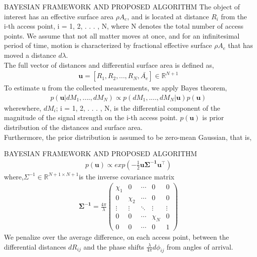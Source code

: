 \documentclass{beamer}
\providecommand{\brak}[1]{\ensuremath{\left(#1\right)}}
\begin{document}
\begin{frame}{BAYESIAN FRAMEWORK AND PROPOSED ALGORITHM}
    The object of interest has an effective surface area $\rho A_e$,
and is located at distance $R_i$ from the i-th access point,
i = 1, 2, . . . , N, where N denotes the total number of access
points. We assume that not all matter moves at once, and for
an infinitesimal period of time, motion is characterized by fractional effective surface $\rho A_e$ that has moved a distance $d\lambda$.\\
The full vector of distances and differential surface area is
defined as,
\begin{align}
    \boldsymbol{u}=[R_1,R_2,...,R_N,\bar{A_e}] \in \mathbb{R}^{N+1}
\end{align}
To estimate u from the collected measurements, we apply Bayes theorem,
\begin{align}
      \mathit{p}(\boldsymbol{u}|dM_1,....,dM_N) \propto \mathit{p}(dM_1,....,dM_N|\boldsymbol{u})\mathit{p}(\boldsymbol{u})
  \end{align} 
wherewhere, $dM_i$; i = 1, 2, . . . , N, is the differential component
of the magnitude of the signal strength on the i-th access
point. $\mathit{p}(\boldsymbol{u})$ is prior distribution of the
distances and surface area.\\
Furthermore, the prior distribution
is assumed to be zero-mean Gaussian, that is,
\end{frame}
\begin{frame}{BAYESIAN FRAMEWORK AND PROPOSED ALGORITHM}
\begin{align}
        p(\boldsymbol{u})\propto exp\brak{-\frac{1}{2}\boldsymbol{u}\boldsymbol{\Sigma^{-1}}\boldsymbol{u}^{\top}}
    \end{align}
    where,${\Sigma^{-1}} \in \mathbb{R}^{N+1\times N+1}$is the inverse covariance matrix
    \begin{align}
    \boldsymbol{\Sigma^{-1}}=\frac{4\pi}{\lambda}\begin{pmatrix}
\chi_1 & 0      & \cdots & 0       & 0 \\
0      & \chi_2 & \cdots & 0       & 0 \\
\vdots & \vdots & \ddots & \vdots  & \vdots  \\
0      & 0      & \cdots & \chi_{N}& 0\\
0      &0       &\cdots  &0        & 1
\end{pmatrix}
\end{align}
We penalize over the average difference, on each access point, between the
differential distances $dR_{ij}$ and the phase shifts $\frac{\lambda}{4\pi}d\phi_{ij}$ from angles of arrival.
\end{frame}
\end{document}
